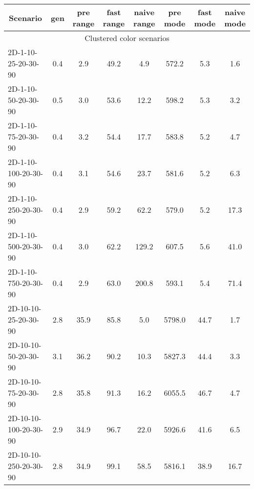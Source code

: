 \documentclass{article}
\begin{document}
\begin{table}[h]
    \begin{center}
        \begin{tabular}{|l||c|c|c|c|c|c|c|}
            \hline
            \multicolumn{1}{|c|}{Scenario} & gen  & pre range & fast range & naive range & pre mode & fast mode & naive mode \\
            \hline
            \hline
            \multicolumn{8}{|c|}{Clustered color scenarios}                                                                  \\
            \hline
            2D-1-10-25-20-30-90           & 0.4  & 2.9       & 49.2       & 4.9         & 572.2    & 5.3       & 1.6        \\
            2D-1-10-50-20-30-90           & 0.5  & 3.0       & 53.6       & 12.2        & 598.2    & 5.3       & 3.2        \\
            2D-1-10-75-20-30-90           & 0.4  & 3.2       & 54.4       & 17.7        & 583.8    & 5.2       & 4.7        \\
            2D-1-10-100-20-30-90          & 0.4  & 3.1       & 54.6       & 23.7        & 581.6    & 5.2       & 6.3        \\
            2D-1-10-250-20-30-90          & 0.4  & 2.9       & 59.2       & 62.2        & 579.0    & 5.2       & 17.3       \\
            2D-1-10-500-20-30-90          & 0.4  & 3.0       & 62.2       & 129.2       & 607.5    & 5.6       & 41.0       \\
            2D-1-10-750-20-30-90          & 0.4  & 2.9       & 63.0       & 200.8       & 593.1    & 5.4       & 71.4       \\
            \hline
            2D-10-10-25-20-30-90          & 2.8  & 35.9      & 85.8       & 5.0         & 5798.0   & 44.7      & 1.7        \\
            2D-10-10-50-20-30-90          & 3.1  & 36.2      & 90.2       & 10.3        & 5827.3   & 44.4      & 3.3        \\
            2D-10-10-75-20-30-90          & 2.8  & 35.8      & 91.3       & 16.2        & 6055.5   & 46.7      & 4.7        \\
            2D-10-10-100-20-30-90         & 2.9  & 34.9      & 96.7       & 22.0        & 5926.6   & 41.6      & 6.5        \\
            2D-10-10-250-20-30-90         & 2.8  & 34.9      & 99.1       & 58.5        & 5816.1   & 38.9      & 16.7       \\

\end{tabular}
\end{center}
\end{table}
\end{document}

